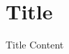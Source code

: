\documentclass[../main/main.tex]{subfiles}
\begin{document}
\section{Title}
\begin{frame}{Title}
Content
\end{frame}
\end{document}
